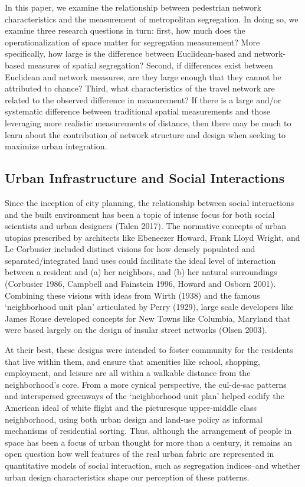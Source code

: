 \documentclass[
  10pt,
]{article}
\begin{document}
In this paper, we examine the relationship between pedestrian network
characteristics and the measurement of metropolitan segregation. In
doing so, we examine three research questions in turn: first, how much
does the operationalization of space matter for segregation measurement?
More specifically, how large is the difference between Euclidean-based
and network-based measures of spatial segregation? Second, if
differences exist between Euclidean and network measures, are they large
enough that they cannot be attributed to chance? Third, what
characteristics of the travel network are related to the observed
difference in measurement? If there is a large and/or systematic
difference between traditional spatial measurements and those leveraging
more realistic measurements of distance, then there may be much to learn
about the contribution of network structure and design when seeking to
maximize urban integration.

\hypertarget{urban-infrastructure-and-social-interactions}{%
\subsection{Urban Infrastructure and Social
Interactions}\label{urban-infrastructure-and-social-interactions}}

Since the inception of city planning, the relationship between social
interactions and the built environment has been a topic of intense focus
for both social scientists and urban designers (Talen 2017). The
normative concepts of urban utopias prescribed by architects like
Ebeneezer Howard, Frank Lloyd Wright, and Le Corbusier included distinct
visions for how densely populated and separated/integrated land uses
could facilitate the ideal level of interaction between a resident and
(a) her neighbors, and (b) her natural surroundings (Corbusier 1986,
Campbell and Fainstein 1996, Howard and Osborn 2001). Combining these
visions with ideas from Wirth (1938) and the famous `neighborhood unit
plan' articulated by Perry (1929), large scale developers like James
Rouse developed concepts for New Towns like Columbia, Maryland that were
based largely on the design of insular street networks (Olsen 2003).

At their best, these designs were intended to foster community for the
residents that live within them, and ensure that amenities like school,
shopping, employment, and leisure are all within a walkable distance
from the neighborhood's core. From a more cynical perspective, the
cul-de-sac patterns and interspersed greenways of the `neighborhood unit
plan' helped codify the American ideal of white flight and the
picturesque upper-middle class neighborhood, using both urban design and
land-use policy as informal mechanisms of residential sorting. Thus,
although the arrangement of people in space has been a focus of urban
thought for more than a century, it remains an open question how well
features of the real urban fabric are represented in quantitative models
of social interaction, such as segregation indices--and whether urban
design characteristics shape our perception of these patterns.
\end{document}
